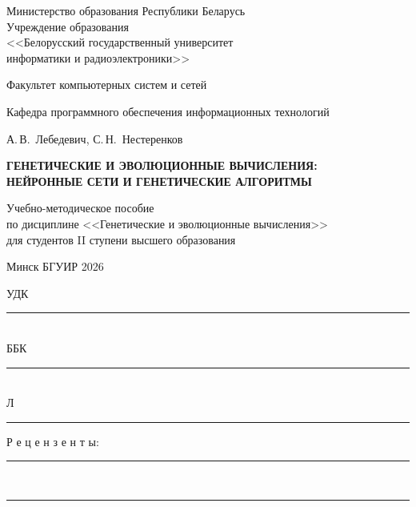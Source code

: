 \begin{titlepage}
\thispagestyle{empty}
\begin{center}
Министерство образования Республики Беларусь\\[2pt]
Учреждение образования\\[2pt]
<<Белорусский государственный университет\\ информатики и радиоэлектроники>>

\vspace{1.2em}
Факультет компьютерных систем и сетей

\vspace{0.4em}
Кафедра программного обеспечения информационных технологий

\vspace{5em}
А.\,В.~Лебедевич, С.\,Н.~Нестеренков

\vspace{4em}
{\fontsize{17}{22}\selectfont\bfseries ГЕНЕТИЧЕСКИЕ И ЭВОЛЮЦИОННЫЕ ВЫЧИСЛЕНИЯ:\\[2pt]
НЕЙРОННЫЕ СЕТИ И ГЕНЕТИЧЕСКИЕ АЛГОРИТМЫ\par}

\vspace{2em}
Учебно-методическое пособие\\
по дисциплине <<Генетические и эволюционные вычисления>>\\
для студентов II ступени высшего образования


\vfill
Минск БГУИР 2026
\end{center}
\end{titlepage}
\setcounter{page}{2}

\thispagestyle{empty}
\noindent УДК \rule{4cm}{0.4pt}\\
ББК \rule{4cm}{0.4pt}\\
\hspace*{1.25cm}Л\rule{1cm}{0.4pt}

\vspace{1.5em}
\begin{center}
Р е ц е н з е н т ы:\\[4pt]
\rule{11cm}{0.4pt}\\[6pt]
\rule{11cm}{0.4pt}
\end{center}

